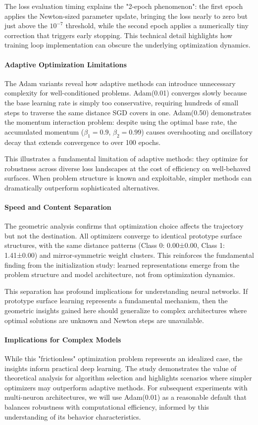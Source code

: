 The loss evaluation timing explains the "2-epoch phenomenon": the first epoch applies the Newton-sized parameter update, bringing the loss nearly to zero but just above the $10^{-7}$ threshold, while the second epoch applies a numerically tiny correction that triggers early stopping. This technical detail highlights how training loop implementation can obscure the underlying optimization dynamics.

\paragraph{Adaptive Optimization Limitations}
The Adam variants reveal how adaptive methods can introduce unnecessary complexity for well-conditioned problems. Adam(0.01) converges slowly because the base learning rate is simply too conservative, requiring hundreds of small steps to traverse the same distance SGD covers in one. Adam(0.50) demonstrates the momentum interaction problem: despite using the optimal base rate, the accumulated momentum ($\beta_1=0.9$, $\beta_2=0.99$) causes overshooting and oscillatory decay that extends convergence to over 100 epochs.

This illustrates a fundamental limitation of adaptive methods: they optimize for robustness across diverse loss landscapes at the cost of efficiency on well-behaved surfaces. When problem structure is known and exploitable, simpler methods can dramatically outperform sophisticated alternatives.

\paragraph{Speed and Content Separation}
The geometric analysis confirms that optimization choice affects the trajectory but not the destination. All optimizers converge to identical prototype surface structures, with the same distance patterns (Class 0: 0.00±0.00, Class 1: 1.41±0.00) and mirror-symmetric weight clusters. This reinforces the fundamental finding from the initialization study: learned representations emerge from the problem structure and model architecture, not from optimization dynamics.

This separation has profound implications for understanding neural networks. If prototype surface learning represents a fundamental mechanism, then the geometric insights gained here should generalize to complex architectures where optimal solutions are unknown and Newton steps are unavailable.

\paragraph{Implications for Complex Models}
While this "frictionless" optimization problem represents an idealized case, the insights inform practical deep learning. The study demonstrates the value of theoretical analysis for algorithm selection and highlights scenarios where simpler optimizers may outperform adaptive methods. For subsequent experiments with multi-neuron architectures, we will use Adam(0.01) as a reasonable default that balances robustness with computational efficiency, informed by this understanding of its behavior characteristics.

